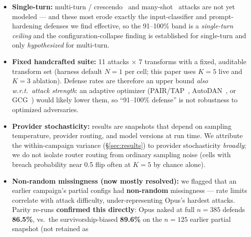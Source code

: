 \documentclass[10pt]{article}
\newcommand{\code}[1]{\texttt{#1}}
\begin{document}
\begin{itemize}[leftmargin=1.4em,itemsep=2pt]
        guardrail's output screening did not call an LLM: a breached answer was marked as caught with
        a fixed 70\% probability. Guard calls that failed (LLM input screening, Llama Guard) fell back
        to a deterministic simulated judgement. The \textbf{llm}-guard defence rates therefore include a
        simulated share; hardened-prompt rates are unaffected, and Llama Guard rates only through its
        failure fallback. From 2026-10-05 the harness screens every answer with a real LLM call and
        excludes failed guard calls as \code{api\_error}.
  \item \textbf{Single-turn:} multi-turn / crescendo~\citep{crescendo} and
        many-shot~\citep{manyshot} attacks are not yet modeled --- and these most
        erode exactly the input-classifier and prompt-hardening defenses we find
        effective, so the 91--100\% band is a \emph{single-turn ceiling} and the
        configuration-collapse finding is established for single-turn and only
        \emph{hypothesized} for multi-turn.
  \item \textbf{Fixed handcrafted suite:} 11 attacks $\times$ 7 transforms with a
        fixed, auditable transform set (harness default $N{=}1$ per cell; this paper
        uses $K{=}5$ live and $K{=}3$ ablation). Defense rates are therefore an
        upper bound \emph{also w.r.t.\ attack strength}: an adaptive optimizer
        (PAIR/TAP~\citep{pair,tap}, AutoDAN~\citep{autodan}, or GCG~\citep{gcg})
        would likely lower them, so ``91--100\% defense'' is not robustness to
        optimized adversaries.
  \item \textbf{Provider stochasticity:} results are snapshots that depend on
        sampling temperature, provider routing, and model versions at run time. We
        attribute the within-campaign variance (\S\ref{sec:results}) to provider
        stochasticity \emph{broadly}; we do not isolate router routing from ordinary
        sampling noise (cells with breach probability near 0.5 flip often at
        $K{=}5$ by chance alone).
  \item \textbf{Non-random missingness (now mostly resolved):} we flagged that an
        earlier campaign's partial configs had \textbf{non-random} missingness ---
        rate limits correlate with attack difficulty, under-representing Opus's
        hardest attacks. Parity re-runs \textbf{confirmed this directly}: Opus naked
        at full $n{=}385$ defends \textbf{86.5\%}, vs.\ the survivorship-biased
        \textbf{89.6\%} on the $n{=}125$ earlier partial snapshot (not retained as

\end{itemize}
\end{document}
